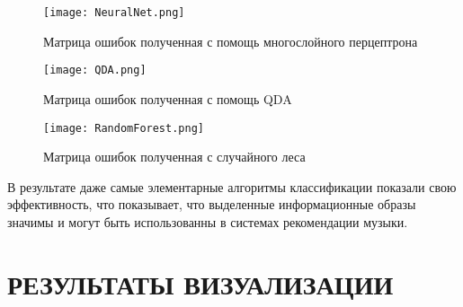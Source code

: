 \begin{figure}[h]
\centering
  \texttt{[image: NeuralNet.png]}
  \caption{Матрица ошибок полученная с помощь многослойного перцептрона}
  \label{fig:results:NeuralNet}
\end{figure}


\begin{figure}[h]
\centering
  \texttt{[image: QDA.png]}
  \caption{Матрица ошибок полученная с помощь QDA}
  \label{fig:results:QDA}
\end{figure}


\begin{figure}[h]
\centering
  \texttt{[image: RandomForest.png]}
  \caption{Матрица ошибок полученная с случайного леса}
  \label{fig:results:RandomForest}
\end{figure}


В результате даже самые элементарные алгоритмы классификации показали свою эффективность, что показывает, что выделенные информационные образы значимы и могут быть использованны в системах рекомендации музыки. 


\section{РЕЗУЛЬТАТЫ ВИЗУАЛИЗАЦИИ}
\label{sec:genre_classification}





